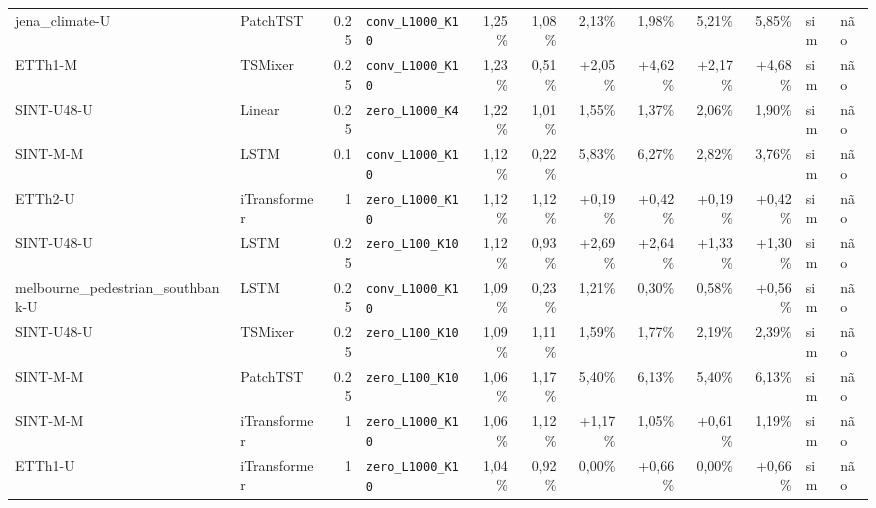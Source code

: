 \begin{longtable}{llrlrrrrrrll}
jena\_climate-U & PatchTST & 0.25 & \texttt{conv\_\allowbreak{}L1000\_\allowbreak{}K10} & \textminus{}1,25\% & \textminus{}1,08\% & \textminus{}2,13\% & \textminus{}1,98\% & \textminus{}5,21\% & \textminus{}5,85\% & sim & n\~ao \\
ETTh1-M & TSMixer & 0.25 & \texttt{conv\_\allowbreak{}L1000\_\allowbreak{}K10} & \textminus{}1,23\% & \textminus{}0,51\% & +2,05\% & +4,62\% & +2,17\% & +4,68\% & sim & n\~ao \\
SINT-U48-U & Linear & 0.25 & \texttt{zero\_\allowbreak{}L1000\_\allowbreak{}K4} & \textminus{}1,22\% & \textminus{}1,01\% & \textminus{}1,55\% & \textminus{}1,37\% & \textminus{}2,06\% & \textminus{}1,90\% & sim & n\~ao \\
SINT-M-M & LSTM & 0.1 & \texttt{conv\_\allowbreak{}L1000\_\allowbreak{}K10} & \textminus{}1,12\% & \textminus{}0,22\% & \textminus{}5,83\% & \textminus{}6,27\% & \textminus{}2,82\% & \textminus{}3,76\% & sim & n\~ao \\
ETTh2-U & iTransformer & 1 & \texttt{zero\_\allowbreak{}L1000\_\allowbreak{}K10} & \textminus{}1,12\% & \textminus{}1,12\% & +0,19\% & +0,42\% & +0,19\% & +0,42\% & sim & n\~ao \\
SINT-U48-U & LSTM & 0.25 & \texttt{zero\_\allowbreak{}L100\_\allowbreak{}K10} & \textminus{}1,12\% & \textminus{}0,93\% & +2,69\% & +2,64\% & +1,33\% & +1,30\% & sim & n\~ao \\
melbourne\_pedestrian\_southbank-U & LSTM & 0.25 & \texttt{conv\_\allowbreak{}L1000\_\allowbreak{}K10} & \textminus{}1,09\% & \textminus{}0,23\% & \textminus{}1,21\% & \textminus{}0,30\% & \textminus{}0,58\% & +0,56\% & sim & n\~ao \\
SINT-U48-U & TSMixer & 0.25 & \texttt{zero\_\allowbreak{}L100\_\allowbreak{}K10} & \textminus{}1,09\% & \textminus{}1,11\% & \textminus{}1,59\% & \textminus{}1,77\% & \textminus{}2,19\% & \textminus{}2,39\% & sim & n\~ao \\
SINT-M-M & PatchTST & 0.25 & \texttt{zero\_\allowbreak{}L100\_\allowbreak{}K10} & \textminus{}1,06\% & \textminus{}1,17\% & \textminus{}5,40\% & \textminus{}6,13\% & \textminus{}5,40\% & \textminus{}6,13\% & sim & n\~ao \\
SINT-M-M & iTransformer & 1 & \texttt{zero\_\allowbreak{}L1000\_\allowbreak{}K10} & \textminus{}1,06\% & \textminus{}1,12\% & +1,17\% & \textminus{}1,05\% & +0,61\% & \textminus{}1,19\% & sim & n\~ao \\
ETTh1-U & iTransformer & 1 & \texttt{zero\_\allowbreak{}L1000\_\allowbreak{}K10} & \textminus{}1,04\% & \textminus{}0,92\% & \textminus{}0,00\% & +0,66\% & \textminus{}0,00\% & +0,66\% & sim & n\~ao \\

\end{longtable}
